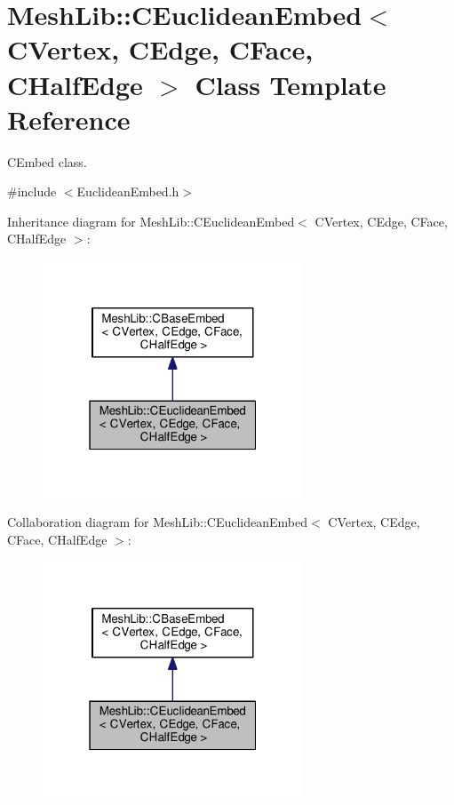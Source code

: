 \hypertarget{class_mesh_lib_1_1_c_euclidean_embed}{}\section{Mesh\+Lib\+:\+:C\+Euclidean\+Embed$<$ C\+Vertex, C\+Edge, C\+Face, C\+Half\+Edge $>$ Class Template Reference}
\label{class_mesh_lib_1_1_c_euclidean_embed}


C\+Embed class.  




{\ttfamily \#include $<$Euclidean\+Embed.\+h$>$}



Inheritance diagram for Mesh\+Lib\+:\+:C\+Euclidean\+Embed$<$ C\+Vertex, C\+Edge, C\+Face, C\+Half\+Edge $>$\+:
\nopagebreak
\begin{figure}[H]
\begin{center}
\leavevmode
\includegraphics[width=220pt]{class_mesh_lib_1_1_c_euclidean_embed__inherit__graph}
\end{center}
\end{figure}


Collaboration diagram for Mesh\+Lib\+:\+:C\+Euclidean\+Embed$<$ C\+Vertex, C\+Edge, C\+Face, C\+Half\+Edge $>$\+:
\nopagebreak
\begin{figure}[H]
\begin{center}
\leavevmode
\includegraphics[width=220pt]{class_mesh_lib_1_1_c_euclidean_embed__coll__graph}
\end{center}
\end{figure}
